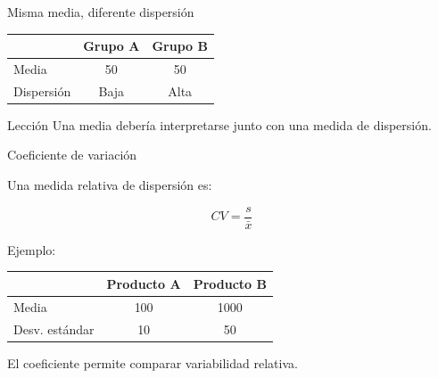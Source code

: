 \documentclass[aspectratio=169,11pt]{beamer}
\begin{document}

\begin{frame}{Misma media, diferente dispersión}

\begin{center}

\begin{tabular}{lcc}
\toprule

&
\textbf{Grupo A}
&
\textbf{Grupo B} \\

\midrule

Media &
50 &
50 \\

Dispersión &
Baja &
Alta \\

\bottomrule

\end{tabular}

\end{center}

\vspace{0.5cm}

\begin{alertblock}{Lección}
Una media debería interpretarse junto con una medida de dispersión.
\end{alertblock}

\end{frame}


\begin{frame}{Coeficiente de variación}

Una medida relativa de dispersión es:

\[
CV
=
\frac{s}{\bar{x}}
\]

Ejemplo:

\begin{center}

\begin{tabular}{lcc}
\toprule

&
Producto A &
Producto B \\

\midrule

Media &
100 &
1000 \\

Desv. estándar &
10 &
50 \\

\bottomrule

\end{tabular}

\end{center}

\vspace{0.4cm}

El coeficiente permite comparar variabilidad relativa.

\end{frame}
\end{document}
